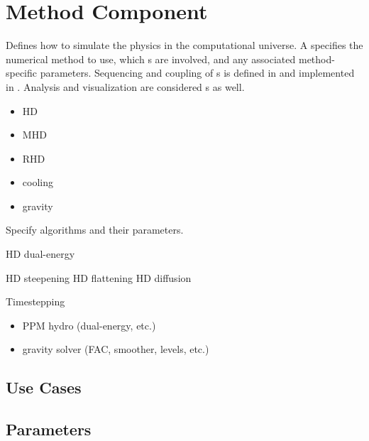 \section{Method Component} \label{s:component-method}

  Defines how to simulate the physics in the computational universe.
  A  specifies the numerical method to use, which
  s are involved, and any associated method-specific
  parameters.  Sequencing and coupling of s is defined in
   and implemented in .  Analysis and
  visualization are considered s as well.

\begin{itemize}
\item HD
\item MHD
\item RHD
\item cooling
\item gravity
\end{itemize}

Specify algorithms and their parameters.

HD dual-energy

HD steepening
HD flattening
HD diffusion

Timestepping


\begin{itemize}
\item PPM hydro (dual-energy, etc.)
\item gravity solver (FAC, smoother, levels, etc.)
\end{itemize}

\subsection{Use Cases}
\subsection{Parameters}

